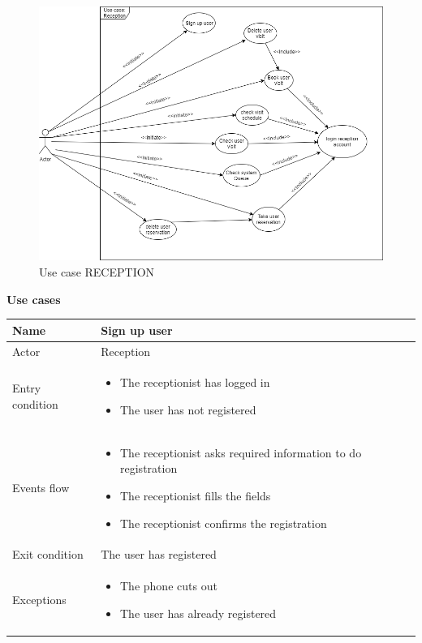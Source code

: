  \begin{figure}[h]
 	\caption{Use case RECEPTION}
 	\label{fig:UML}
 	
 	\centering
 	\includegraphics[width=1\textwidth, height=1\textwidth]{diagrams/UseCaseReception.png}
 	
 \end{figure}
 
 \addvspace{1cm} 
 {\normalsize \textbf{Use cases}}
 \par \medskip
 
 \begin{tabular}{|p{5cm} | p{7cm} | }
 	\hline
 	Name & Sign up user  \\
 	\hline
 	Actor & Reception \\
 	\hline
 	Entry condition &
 	\begin{itemize}
 		\item The receptionist has logged in 
 		\item The user has not registered
 	\end{itemize} \\
 	\hline
 	Events flow & 
 	\begin{itemize}
 		\item The receptionist asks required information to do registration
 		\item The receptionist fills the fields
 		\item The receptionist confirms the registration
 	\end{itemize} \\
 	\hline
 	Exit condition &
 	The user has registered \\
 	\hline 
 	Exceptions & 
 	\begin{itemize}
 		\item The phone cuts out
 		\item The user has already registered
 	\end{itemize} \\
 	\hline
 \end{tabular}

